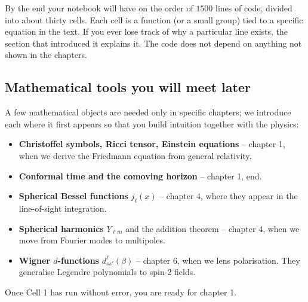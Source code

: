 By the end your notebook will have on the order of $1500$ lines of code, divided into about thirty cells. Each cell is a function (or a small group) tied to a specific equation in the text. If you ever lose track of why a particular line exists, the section that introduced it explains it. The code does not depend on anything not shown in the chapters.

\subsection{Mathematical tools you will meet later}

A few mathematical objects are needed only in specific chapters; we introduce each where it first appears so that you build intuition together with the physics:

\begin{itemize}
  \item \textbf{Christoffel symbols, Ricci tensor, Einstein equations} -- chapter 1, when we derive the Friedmann equation from general relativity.
  \item \textbf{Conformal time and the comoving horizon} -- chapter 1, end.
  \item \textbf{Spherical Bessel functions} $j_\ell(x)$ -- chapter 4, where they appear in the line-of-sight integration.
  \item \textbf{Spherical harmonics} $Y_{\ell m}$ and the addition theorem -- chapter 4, when we move from Fourier modes to multipoles.
  \item \textbf{Wigner $d$-functions} $d^\ell_{ss'}(\beta)$ -- chapter 6, when we lens polarisation. They generalise Legendre polynomials to spin-2 fields.
\end{itemize}

\noindent\hrulefill

\noindent Once Cell 1 has run without error, you are ready for chapter 1.
